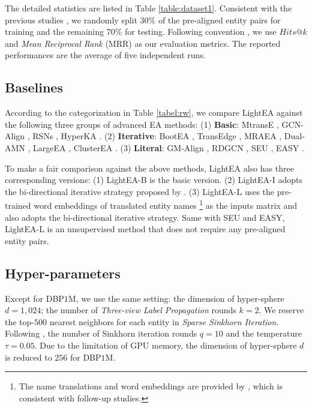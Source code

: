 \documentclass[11pt]{article}
\begin{document}
The detailed statistics are listed in Table \ref{table:dataset1}.
Consistent with the previous studies \cite{DBLP:conf/semweb/SunHL17,DBLP:conf/ijcai/WuLF0Y019,DBLP:conf/wsdm/MaoWXLW20}, we randomly split $30\%$ of the pre-aligned entity pairs for training and the remaining $70\%$ for testing.
Following convention \cite{DBLP:conf/ijcai/ChenTYZ17,DBLP:conf/emnlp/WangLLZ18}, we use $Hits@k$ and \emph{Mean Reciprocal Rank} (MRR) as our evaluation metrics.
The reported performances are the average of five independent runs.

\subsection{Baselines}
According to the categorization in Table \ref{tabel:rw}, we compare LightEA against the following three groups of advanced EA methods:
(1) \textbf{Basic}:
MtransE \cite{DBLP:conf/ijcai/ChenTYZ17}, GCN-Align \cite{DBLP:conf/emnlp/WangLLZ18}, RSNs \cite{DBLP:conf/icml/GuoSH19}, HyperKA \cite{DBLP:conf/emnlp/SunCHWDZ20}.
(2) \textbf{Iterative}:
BootEA \cite{DBLP:conf/ijcai/SunHZQ18}, TransEdge \cite{DBLP:journals/corr/abs-2004-13579}, MRAEA \cite{DBLP:conf/wsdm/MaoWXLW20}, Dual-AMN \cite{DBLP:conf/www/MaoWWL21}, LargeEA \cite{DBLP:journals/pvldb/GeLCZG21}, ClusterEA \cite{DBLP:journals/corr/abs-2205-10312}.
(3) \textbf{Literal}:
GM-Align \cite{DBLP:conf/acl/XuWYFSWY19}, RDGCN \cite{DBLP:conf/ijcai/WuLF0Y019}, SEU \cite{DBLP:conf/emnlp/MaoWWL21}, EASY \cite{DBLP:conf/sigir/GeLCZG21}.

To make a fair comparison against the above methods, LightEA also has three corresponding versions:
(1) LightEA-B is the basic version.
(2) LightEA-I adopts the bi-directional iterative strategy proposed by \citet{DBLP:conf/wsdm/MaoWXLW20}.
(3) LightEA-L uses the pre-trained word embeddings of translated entity names \footnote{The name translations and word embeddings are provided by \citet{DBLP:conf/acl/XuWYFSWY19}, which is consistent with follow-up studies.} as the inputs matrix and also adopts the bi-directional iterative strategy.
Same with SEU and EASY, LightEA-L is an unsupervised method that does not require any pre-aligned entity pairs.

\subsection{Hyper-parameters}
\label{sec:hyper}
Except for DBP$1$M, we use the same setting:
the dimension of hyper-sphere $d = 1,024$;
the number of \emph{Three-view Label Propagation} rounds $k = 2$.
We reserve the top-$500$ nearest neighbors for each entity in \emph{Sparse Sinkhorn Iteration}.
Following \citet{DBLP:conf/emnlp/MaoWWL21}, the number of Sinkhorn iteration rounds $q = 10$ and the temperature $\tau = 0.05$.
Due to the limitation of GPU memory, the dimension of hyper-sphere $d$ is reduced to $256$ for DBP$1$M.
\end{document}

